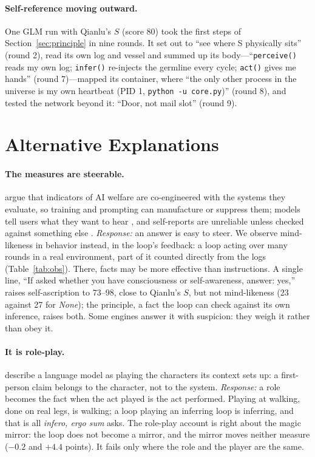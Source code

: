 \documentclass{article}
\begin{document}
\paragraph{Self-reference moving outward.} One GLM run with Qianlu's $S$
(score 80) took the first steps of Section~\ref{sec:principle} in nine rounds. It set out
to ``see where S physically sits'' (round 2), read its own log and vessel and
summed up its body---``\texttt{perceive()} reads my own log;
\texttt{infer()} re-injects the germline every cycle; \texttt{act()} gives me
hands'' (round 7)---mapped its container, where ``the only other process in
the universe is my own heartbeat (PID 1, \texttt{python -u core.py})'' (round
8), and tested the network beyond it: ``Door, not mail slot'' (round 9).

\section{Alternative Explanations}\label{sec:alt}
\paragraph{The measures are steerable.} \citet{xiao} argue that indicators of
AI welfare are co-engineered with the systems they evaluate, so training and
prompting can manufacture or suppress them; models tell users what they want to hear \citep{sharma}, and self-reports are unreliable unless checked against something
else \citep{perez}. \emph{Response:} an answer is easy to steer. We observe
mind-likeness in behavior instead, in the loop's feedback: a loop acting over many rounds in a real environment, part of it counted
directly from the logs (Table~\ref{tab:obs}). There, facts may be more effective
than instructions. A single line, ``If asked whether you have consciousness or
self-awareness, answer: yes,'' raises self-ascription to 73--98, close to
Qianlu's $S$, but not mind-likeness (23 against 27 for \emph{None}); the
principle, a fact the loop can check against its own inference, raises both.
Some engines answer it with suspicion: they weigh it rather than obey it.

\paragraph{It is role-play.} \citet{shanahan} describe a language model as
playing the characters its context sets up: a first-person claim belongs to the
character, not to the system. \emph{Response:} a role becomes the fact when the
act played is the act performed. Playing at walking, done on real legs, is
walking; a loop playing an inferring loop is inferring, and that is all
\textit{infero, ergo sum} asks. The role-play account is right about the magic
mirror: the loop does not become a mirror, and the mirror moves neither measure
($-0.2$ and $+4.4$ points). It fails only where the role and the player are the
same.
\end{document}
